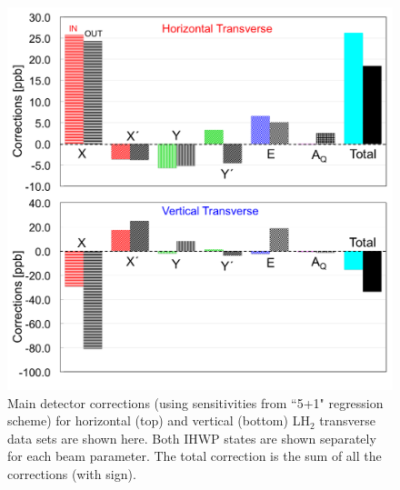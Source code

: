 \begin{figure}[!h]
	\begin{center}
	\includegraphics[width=15.0cm]{figures/correctionSummary_LH2}
	\end{center}
	\caption
	{Main detector corrections (using sensitivities from ``5+1" regression scheme) for horizontal (top) and vertical (bottom) LH$_{2}$ transverse data sets are shown here. Both IHWP states are shown separately for each beam parameter. The total correction is the sum of all the corrections (with sign).}
	\label{fig:correctionSummary_LH2}
\end{figure}


